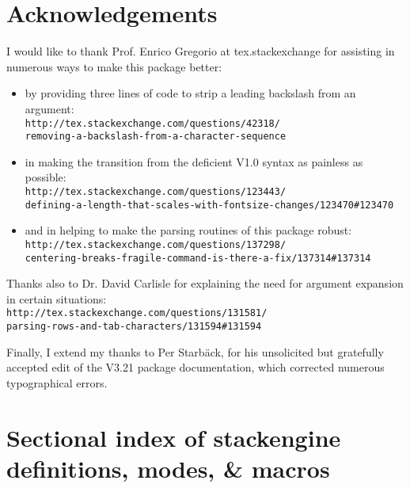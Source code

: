 \documentclass{article}
\let\vb\verb
\begin{document}
\clearpage
\section{Acknowledgements}

I would like to thank Prof. Enrico Gregorio at tex.stackexchange for
assisting in numerous ways to make this package better:

\begin{itemize}

\item by providing  three lines of code to strip a leading 
backslash from an argument:\\
\vb|http://tex.stackexchange.com/questions/42318/|\\
\vb|removing-a-backslash-from-a-character-sequence|

\item in making the
transition from the deficient V1.0 syntax as painless as possible:\\
\vb|http://tex.stackexchange.com/questions/123443/|\\
\vb|defining-a-length-that-scales-with-fontsize-changes/123470#123470|

\item and in helping to make the parsing routines of this package robust:\\
\vb|http://tex.stackexchange.com/questions/137298/|\\
\vb|centering-breaks-fragile-command-is-there-a-fix/137314#137314|

\end{itemize}

Thanks also to Dr. David Carlisle for explaining the need for argument
expansion in certain situations:\\
\vb|http://tex.stackexchange.com/questions/131581/|\\
\vb|parsing-rows-and-tab-characters/131594#131594|

Finally, I extend my thanks to Per Starb\"ack, for 
his unsolicited but gratefully accepted edit of the V3.21
package documentation, which corrected numerous typographical errors.

\section{Sectional index of \textsf{stackengine} definitions, modes, 
  \& macros\label{s:index}}
\end{document}
